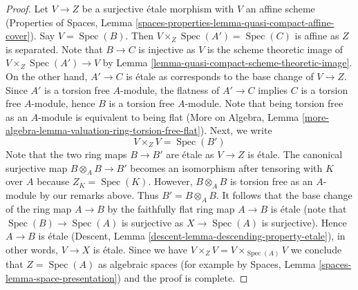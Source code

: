 \documentclass[10pt,a4paper]{amsart}
\theoremstyle{plain}
\theoremstyle{definition}
\theoremstyle{remark}
\numberwithin{equation}{subsection}
\def\Spec{\mathop{\mathrm{Spec}}}
\begin{document}
\begin{proof}
\medskip\noindent
Let $V \to Z$ be a surjective \'etale morphism with $V$ an
affine scheme (Properties of Spaces, Lemma
\ref{spaces-properties-lemma-quasi-compact-affine-cover}).
Say $V = \Spec(B)$. Then $V \times_Z \Spec(A') = \Spec(C)$
is affine as $Z$ is separated. Note that $B \to C$ is injective
as $V$ is the scheme theoretic image of $V \times_Z \Spec(A') \to V$
by Lemma \ref{lemma-quasi-compact-scheme-theoretic-image}.
On the other hand, $A' \to C$ is \'etale as corresponds
to the base change of $V \to Z$.
Since $A'$ is a torsion free $A$-module,
the flatness of $A' \to C$ implies $C$ is a torsion free
$A$-module, hence $B$ is a torsion free $A$-module.
Note that being torsion free as an $A$-module is
equivalent to being flat (More on Algebra, Lemma
\ref{more-algebra-lemma-valuation-ring-torsion-free-flat}).
Next, we write
$$
V \times_Z V = \Spec(B')
$$
Note that the two ring maps $B \to B'$ are \'etale as $V \to Z$
is \'etale. The canonical surjective map $B \otimes_A B \to B'$
becomes an isomorphism after tensoring with $K$ over $A$
because $Z_K = \Spec(K)$. However, $B \otimes_A B$ is torsion
free as an $A$-module by our remarks above. Thus $B' = B \otimes_A B$.
It follows that the base change of the ring map
$A \to B$ by the faithfully flat ring map $A \to B$
is \'etale (note that $\Spec(B) \to \Spec(A)$ is surjective
as $X \to \Spec(A)$ is surjective). Hence $A \to B$ is
\'etale (Descent, Lemma \ref{descent-lemma-descending-property-etale}),
in other words, $V \to X$ is \'etale.
Since we have $V \times_Z V = V \times_{\Spec(A)} V$
we conclude that $Z = \Spec(A)$ as algebraic spaces
(for example by Spaces, Lemma \ref{spaces-lemma-space-presentation})
and the proof is complete.
\end{proof}
\end{document}
